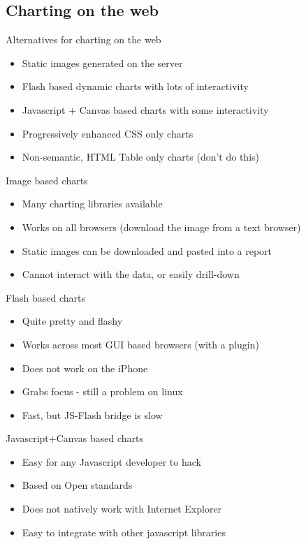 \documentclass{beamer}
\begin{document}
\subsection{Charting on the web}

\begin{frame}{Alternatives for charting on the web}
  \begin{itemize}
  \item Static images generated on the server
  \item Flash based dynamic charts with lots of interactivity
  \item Javascript + Canvas based charts with some interactivity
  \item Progressively enhanced CSS only charts
  \item Non-semantic, HTML Table only charts (don't do this)
  \end{itemize}
\end{frame}

\begin{frame}{Image based charts}
  \begin{itemize}
  \item Many charting libraries available
  \item Works on all browsers (download the image from a text browser)
  \item Static images can be downloaded and pasted into a report
  \item Cannot interact with the data, or easily drill-down
  \end{itemize}
\end{frame}

\begin{frame}{Flash based charts}
  \begin{itemize}
  \item Quite pretty and flashy
  \item Works across most GUI based browsers (with a plugin)
  \item Does not work on the iPhone
  \item Grabs focus - still a problem on linux
  \item Fast, but JS-Flash bridge is slow
  \end{itemize}
\end{frame}

\begin{frame}{Javascript+Canvas based charts}
  \begin{itemize}
  \item Easy for any Javascript developer to hack
  \item Based on Open standards
  \item Does not natively work with Internet Explorer
  \item Easy to integrate with other javascript libraries
  \end{itemize}
\end{frame}
\end{document}
